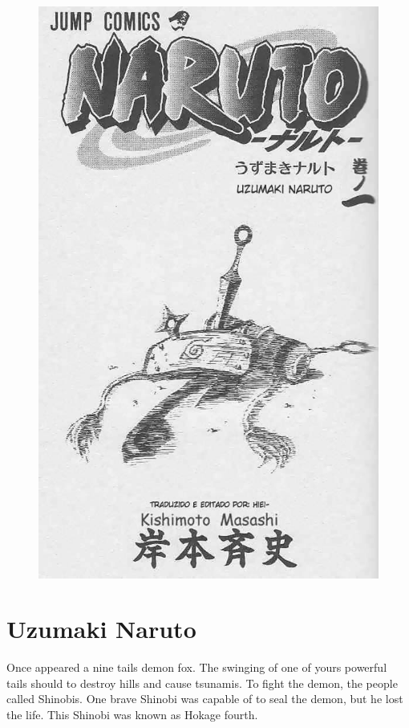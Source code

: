 \documentclass[
10pt,				%
openright,			%
oneside,			%
a5paper,			%
brazil,				%
french,				%
english,			%
sumario=tradicional
]{abntex2}
\begin{document}
\begin{figure}[h!]
	\centering
	\includegraphics[width=\textwidth]{imgs/img_cap_volume_one_chapter_zero.jpg}
\end{figure}

\chapter{Uzumaki Naruto}

Once appeared a nine tails demon fox. The swinging of one of yours powerful tails should to destroy hills and cause tsunamis. To fight the demon, the people called Shinobis. One brave Shinobi was capable of to seal the demon, but he lost the life. This Shinobi was known as Hokage fourth.\\
\end{document}

